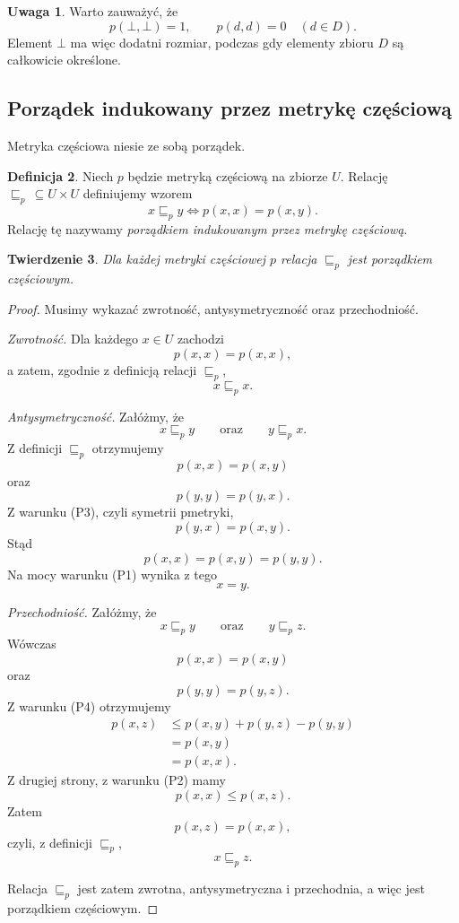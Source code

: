 \documentclass[11pt,a4paper]{article}
\theoremstyle{definition}
\newtheorem{definicja}{Definicja}[section]
\newtheorem{uwaga}[definicja]{Uwaga}
\theoremstyle{plain}
\newtheorem{twierdzenie}[definicja]{Twierdzenie}
\newcommand{\bt}{\bot}                            %
\begin{document}
\begin{uwaga}
	Warto zauważyć, że
	\[
	p(\bt,\bt)=1,
	\qquad
	p(d,d)=0
	\quad(d\in D).
	\]
	Element $\bt$ ma więc dodatni rozmiar, podczas gdy elementy zbioru $D$
	są całkowicie określone.
\end{uwaga}

\subsection{Porządek indukowany przez metrykę częściową}

Metryka częściowa niesie ze sobą porządek. 

\begin{definicja}\label{def:porzadek_indukowany_pmetryka}
	Niech $p$ będzie metryką częściową na zbiorze $U$. Relację
	$\sqsubseteq_p \, \subseteq U \times U$ definiujemy wzorem
	\[
	x\sqsubseteq_p y
	\iff
	p(x,x)=p(x,y).
	\]
	Relację tę nazywamy \emph{porządkiem indukowanym przez metrykę częściową}.
\end{definicja}

\begin{twierdzenie}\label{tw:porzadek_pmetryka}
	Dla każdej metryki częściowej $p$ relacja $\sqsubseteq_p$ jest
	porządkiem częściowym.
\end{twierdzenie}

\begin{proof}
	Musimy wykazać zwrotność, antysymetryczność oraz przechodniość.
	
	\emph{Zwrotność.}
	Dla każdego $x\in U$ zachodzi
	\[
	p(x,x)=p(x,x),
	\]
	a zatem, zgodnie z definicją relacji $\sqsubseteq_p$,
	\[
	x\sqsubseteq_p x.
	\]
	
	\emph{Antysymetryczność.}
	Załóżmy, że
	\[
	x\sqsubseteq_p y
	\qquad\text{oraz}\qquad
	y\sqsubseteq_p x.
	\]
	Z definicji $\sqsubseteq_p$ otrzymujemy
	\[
	p(x,x)=p(x,y)
	\]
	oraz
	\[
	p(y,y)=p(y,x).
	\]
	Z warunku (P3), czyli symetrii pmetryki,
	\[
	p(y,x)=p(x,y).
	\]
	Stąd
	\[
	p(x,x)=p(x,y)=p(y,y).
	\]
	Na mocy warunku (P1) wynika z tego
	\[
	x=y.
	\]
	
	\emph{Przechodniość.}
	Załóżmy, że
	\[
	x\sqsubseteq_p y
	\qquad\text{oraz}\qquad
	y\sqsubseteq_p z.
	\]
	Wówczas
	\[
	p(x,x)=p(x,y)
	\]
	oraz
	\[
	p(y,y)=p(y,z).
	\]
	Z warunku (P4) otrzymujemy
	\[
	\begin{aligned}
		p(x,z)
		&\leq p(x,y)+p(y,z)-p(y,y)\\
		&=p(x,y)\\
		&=p(x,x).
	\end{aligned}
	\]
	Z drugiej strony, z warunku (P2) mamy
	\[
	p(x,x)\leq p(x,z).
	\]
	Zatem
	\[
	p(x,z)=p(x,x),
	\]
	czyli, z definicji $\sqsubseteq_p$,
	\[
	x\sqsubseteq_p z.
	\]
	
	Relacja $\sqsubseteq_p$ jest zatem zwrotna, antysymetryczna
	i przechodnia, a więc jest porządkiem częściowym.
\end{proof}
\end{document}
